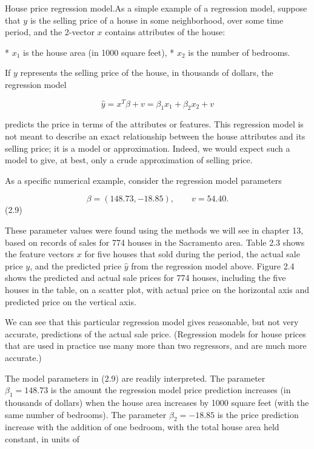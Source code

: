 House price regression model.As a simple example of a regression model, suppose that \(y\) is the selling price of a house in some neighborhood, over some time period, and the 2-vector \(x\) contains attributes of the house:

* \(x_{1}\) is the house area (in 1000 square feet),
* \(x_{2}\) is the number of bedrooms.

If \(y\) represents the selling price of the house, in thousands of dollars, the regression model

\[\hat{y}=x^{T}\beta+v=\beta_{1}x_{1}+\beta_{2}x_{2}+v\]

predicts the price in terms of the attributes or features. This regression model is not meant to describe an exact relationship between the house attributes and its selling price; it is a model or approximation. Indeed, we would expect such a model to give, at best, only a crude approximation of selling price.

As a specific numerical example, consider the regression model parameters

\[\beta=(148.73,-18.85),\qquad v=54.40.\] (2.9)

These parameter values were found using the methods we will see in chapter 13, based on records of sales for 774 houses in the Sacramento area. Table 2.3 shows the feature vectors \(x\) for five houses that sold during the period, the actual sale price \(y\), and the predicted price \(\hat{y}\) from the regression model above. Figure 2.4 shows the predicted and actual sale prices for 774 houses, including the five houses in the table, on a scatter plot, with actual price on the horizontal axis and predicted price on the vertical axis.

We can see that this particular regression model gives reasonable, but not very accurate, predictions of the actual sale price. (Regression models for house prices that are used in practice use many more than two regressors, and are much more accurate.)

The model parameters in (2.9) are readily interpreted. The parameter \(\beta_{1}=148.73\) is the amount the regression model price prediction increases (in thousands of dollars) when the house area increases by 1000 square feet (with the same number of bedrooms). The parameter \(\beta_{2}=-18.85\) is the price prediction increase with the addition of one bedroom, with the total house area held constant, in units of

